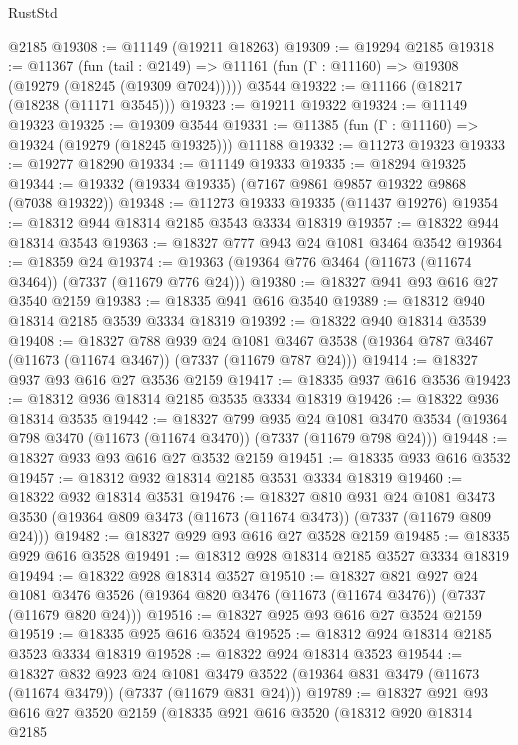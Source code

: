 \begin{lexlean}{RustStd}
\begin{coremodule}
    @2185
@19308 := @11149 (@19211 @18263)
@19309 := @19294 @2185
@19318 := @11367
    (fun (tail : @2149) => @11161 (fun (Γ : @11160) => @19308 (@19279 (@18245 (@19309 @7024)))))
    @3544
@19322 := @11166 (@18217 (@18238 (@11171 @3545)))
@19323 := @19211 @19322
@19324 := @11149 @19323
@19325 := @19309 @3544
@19331 := @11385 (fun (Γ : @11160) => @19324 (@19279 (@18245 @19325))) @11188
@19332 := @11273 @19323
@19333 := @19277 @18290
@19334 := @11149 @19333
@19335 := @18294 @19325
@19344 := @19332 (@19334 @19335) (@7167 @9861 @9857 @19322 @9868 (@7038 @19322))
@19348 := @11273 @19333 @19335 (@11437 @19276)
@19354 := @18312 @944 @18314 @2185 @3543 @3334 @18319
@19357 := @18322 @944 @18314 @3543
@19363 := @18327 @777 @943 @24 @1081 @3464 @3542
@19364 := @18359 @24
@19374 := @19363 (@19364 @776 @3464 (@11673 (@11674 @3464)) (@7337 (@11679 @776 @24)))
@19380 := @18327 @941 @93 @616 @27 @3540 @2159
@19383 := @18335 @941 @616 @3540
@19389 := @18312 @940 @18314 @2185 @3539 @3334 @18319
@19392 := @18322 @940 @18314 @3539
@19408 := @18327
    @788
    @939
    @24
    @1081
    @3467
    @3538
    (@19364 @787 @3467 (@11673 (@11674 @3467)) (@7337 (@11679 @787 @24)))
@19414 := @18327 @937 @93 @616 @27 @3536 @2159
@19417 := @18335 @937 @616 @3536
@19423 := @18312 @936 @18314 @2185 @3535 @3334 @18319
@19426 := @18322 @936 @18314 @3535
@19442 := @18327
    @799
    @935
    @24
    @1081
    @3470
    @3534
    (@19364 @798 @3470 (@11673 (@11674 @3470)) (@7337 (@11679 @798 @24)))
@19448 := @18327 @933 @93 @616 @27 @3532 @2159
@19451 := @18335 @933 @616 @3532
@19457 := @18312 @932 @18314 @2185 @3531 @3334 @18319
@19460 := @18322 @932 @18314 @3531
@19476 := @18327
    @810
    @931
    @24
    @1081
    @3473
    @3530
    (@19364 @809 @3473 (@11673 (@11674 @3473)) (@7337 (@11679 @809 @24)))
@19482 := @18327 @929 @93 @616 @27 @3528 @2159
@19485 := @18335 @929 @616 @3528
@19491 := @18312 @928 @18314 @2185 @3527 @3334 @18319
@19494 := @18322 @928 @18314 @3527
@19510 := @18327
    @821
    @927
    @24
    @1081
    @3476
    @3526
    (@19364 @820 @3476 (@11673 (@11674 @3476)) (@7337 (@11679 @820 @24)))
@19516 := @18327 @925 @93 @616 @27 @3524 @2159
@19519 := @18335 @925 @616 @3524
@19525 := @18312 @924 @18314 @2185 @3523 @3334 @18319
@19528 := @18322 @924 @18314 @3523
@19544 := @18327
    @832
    @923
    @24
    @1081
    @3479
    @3522
    (@19364 @831 @3479 (@11673 (@11674 @3479)) (@7337 (@11679 @831 @24)))
@19789 := @18327
    @921
    @93
    @616
    @27
    @3520
    @2159
    (@18335
      @921
      @616
      @3520
      (@18312
        @920
        @18314
        @2185

\end{coremodule}
\end{lexlean}
